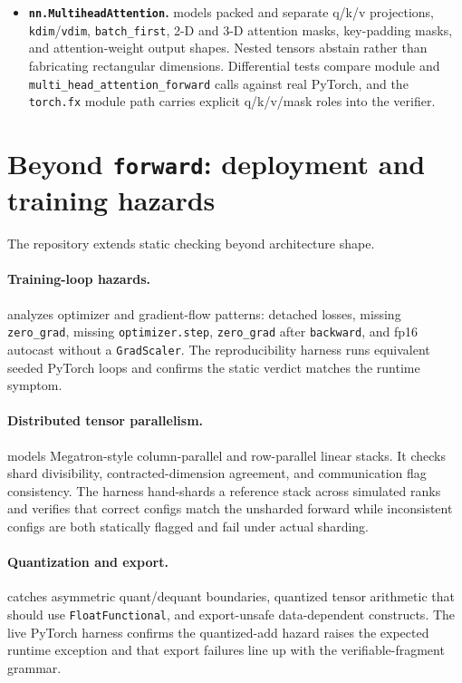 \documentclass[11pt]{article}
\begin{document}
\begin{itemize}[leftmargin=2em]
  including the easy-to-get-wrong distinction that \texttt{grid\_sample} accepts
  empty output grids while rejecting empty input spatial axes.
  \item \textbf{\texttt{nn.MultiheadAttention}.}
   models packed and separate q/k/v projections,
  \texttt{kdim}/\texttt{vdim}, \texttt{batch\_first}, 2-D and 3-D attention
  masks, key-padding masks, and attention-weight output shapes.  Nested tensors
  abstain rather than fabricating rectangular dimensions.  Differential tests
  compare module and \texttt{multi\_head\_attention\_forward} calls against real
  PyTorch, and the \texttt{torch.fx} module path carries explicit q/k/v/mask
  roles into the verifier.
\end{itemize}

\section{Beyond \texttt{forward}: deployment and training hazards}

The repository extends static checking beyond architecture shape.

\paragraph{Training-loop hazards.}
 analyzes optimizer and gradient-flow
patterns: detached losses, missing \texttt{zero\_grad}, missing
\texttt{optimizer.step}, \texttt{zero\_grad} after \texttt{backward}, and fp16
autocast without a \texttt{GradScaler}.  The reproducibility harness runs
equivalent seeded PyTorch loops and confirms the static verdict matches the
runtime symptom.

\paragraph{Distributed tensor parallelism.}
 models Megatron-style column-parallel and
row-parallel linear stacks.  It checks shard divisibility, contracted-dimension
agreement, and communication flag consistency.  The harness hand-shards a
reference stack across simulated ranks and verifies that correct configs match
the unsharded forward while inconsistent configs are both statically flagged
and fail under actual sharding.

\paragraph{Quantization and export.}
 catches asymmetric quant/dequant boundaries,
quantized tensor arithmetic that should use \texttt{FloatFunctional}, and
export-unsafe data-dependent constructs.  The live PyTorch harness confirms
the quantized-add hazard raises the expected runtime exception and that export
failures line up with the verifiable-fragment grammar.
\end{document}
